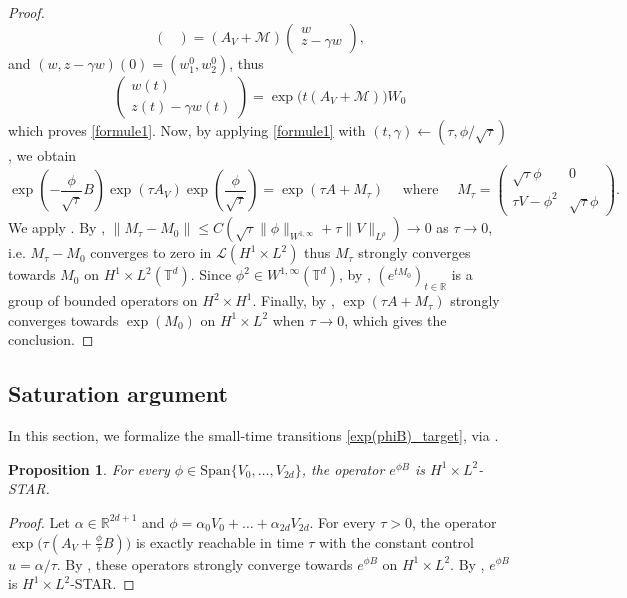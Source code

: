 \documentclass[a4paper]{article}
\theoremstyle{plain}
\newtheorem{proposition}[theorem]{Proposition}
\newcommand{\T}{\mathbb{T}}
\newcommand{\R}{\mathbb{R}}
\begin{document}
\begin{proof}
$$\begin{pmatrix}
\end{pmatrix}
= (A_V+\mathcal{M}) \begin{pmatrix}
    w \\ z-\gamma w
\end{pmatrix},$$
and $(w,z-\gamma w)(0)=(w_1^0,w_2^0)$, thus
$$\begin{pmatrix}
    w(t) \\ z(t)-\gamma w(t)
\end{pmatrix}
= \exp \big(t(A_V+\mathcal{M}) \big) W_0$$
which proves \eqref{formule1}. Now, by applying \eqref{formule1} with $(t,\gamma) \leftarrow (\tau,\phi/\sqrt{\tau})$, we obtain
$$\exp \left(-\frac{\phi}{\sqrt{\tau}}B \right) \exp(\tau A_V) \exp \left( \frac{\phi}{\sqrt{\tau}} \right) 
= \exp(\tau A + M_{\tau}) 
\quad \text{ where } \quad
M_{\tau}=\begin{pmatrix}
\sqrt{\tau} \phi &  0 \\  \tau V  - \phi^2 & \sqrt{\tau} \phi
\end{pmatrix}.$$
We apply .
By ,
$\|M_{\tau}-M_0\| \leq C ( \sqrt{\tau}\|\phi\|_{W^{1,\infty}} + \tau \|V\|_{L^{\rho}} ) \to 0$ as $\tau \to 0$, i.e. $M_{\tau}-M_0$ converges to zero in $\mathcal{L}(H^1 \times L^2)$ thus $M_{\tau}$ strongly converges towards $M_0$ on  $H^1 \times L^2(\T^d)$. Since $\phi^2 \in W^{1,\infty}(\T^d)$, by , $(e^{tM_0})_{t\in\R}$ is a group of bounded operators on $H^2 \times H^1$. Finally, by , $\exp(\tau A+M_{\tau})$ strongly converges towards $\exp(M_0)$ on $H^1 \times L^2$ when $\tau \to 0$, which gives the conclusion.   
\end{proof}




\subsection{Saturation argument}
\label{subsec:Saturation}

In this section, we formalize the small-time transitions \eqref{exp(phiB)_target}, via .

\begin{proposition} \label{Lem:psi_init}
    For every $\phi \in \text{Span}\{V_0,\dots,V_{2d}\}$, the operator
    $e^{\phi B}$ is $H^1 \times L^2$-STAR.
\end{proposition}

\begin{proof}
Let $\alpha \in \R^{2d+1}$ and $\phi=\alpha_0 V_0 + \dots + \alpha_{2d} V_{2d}$. For every $\tau>0$, the operator 
$\exp\big(\tau (A_V + \frac{\phi}{\tau}B) \big)$ is exactly reachable in time $\tau$ with the constant control $u=\alpha/\tau$. By , these operators strongly converge towards $e^{\phi B}$ on $H^1 \times L^2$. By , $e^{\phi B}$ is $H^1 \times L^2$-STAR.
\end{proof}
\end{document}
